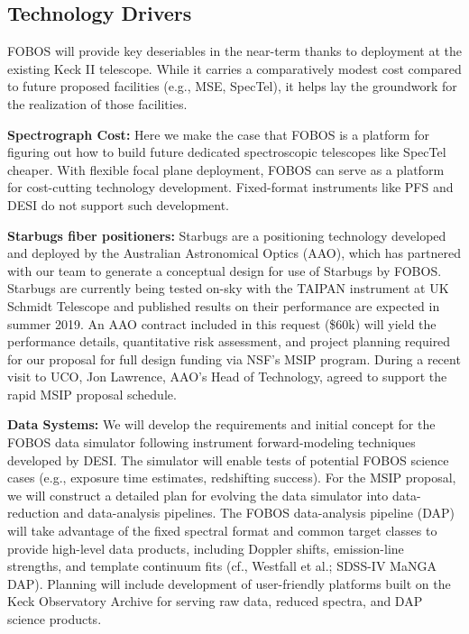 

\subsection{Technology Drivers}
\label{sec:design}

FOBOS will provide key deseriables in the near-term thanks to deployment at the existing Keck II telescope.  While it carries a comparatively modest cost compared to future proposed facilities (e.g., MSE, SpecTel), it helps lay the groundwork for the realization of those facilities.



\noindent \textbf{Spectrograph Cost:} Here we make the case that FOBOS is a platform for figuring out how to build future dedicated spectroscopic telescopes like SpecTel cheaper.  With flexible focal plane deployment, FOBOS can serve as a platform for cost-cutting technology development.  Fixed-format instruments like PFS and DESI do not support such development.

\noindent \textbf{Starbugs fiber positioners:} Starbugs are a
positioning technology developed and deployed by the Australian
Astronomical Optics (AAO), which has partnered with our team to
generate a conceptual design for use of Starbugs by FOBOS. Starbugs
are currently being tested on-sky with the TAIPAN instrument at UK
Schmidt Telescope and published results on their performance are
expected in summer 2019. An AAO contract included in this request
(\$60k) will yield the performance details, quantitative risk
assessment, and project planning required for our proposal for full
design funding via NSF's MSIP program. During a recent visit to UCO,
Jon Lawrence, AAO's Head of Technology, agreed to support the rapid
MSIP proposal schedule.


\noindent \textbf{Data Systems:} We will develop the requirements and
initial concept for the FOBOS data simulator following instrument
forward-modeling techniques developed by DESI. The simulator will
enable tests of potential FOBOS science cases (e.g., exposure time
estimates, redshifting success). For the MSIP proposal, we will
construct a detailed plan for evolving the data simulator into
data-reduction and data-analysis pipelines. The FOBOS data-analysis
pipeline (DAP) will take advantage of the fixed spectral format and
common target classes to provide high-level data products, including
Doppler shifts, emission-line strengths, and template continuum fits
(cf., Westfall et al.; SDSS-IV MaNGA DAP). Planning will include
development of user-friendly platforms built on the Keck Observatory
Archive for serving raw data, reduced spectra, and DAP science
products.



